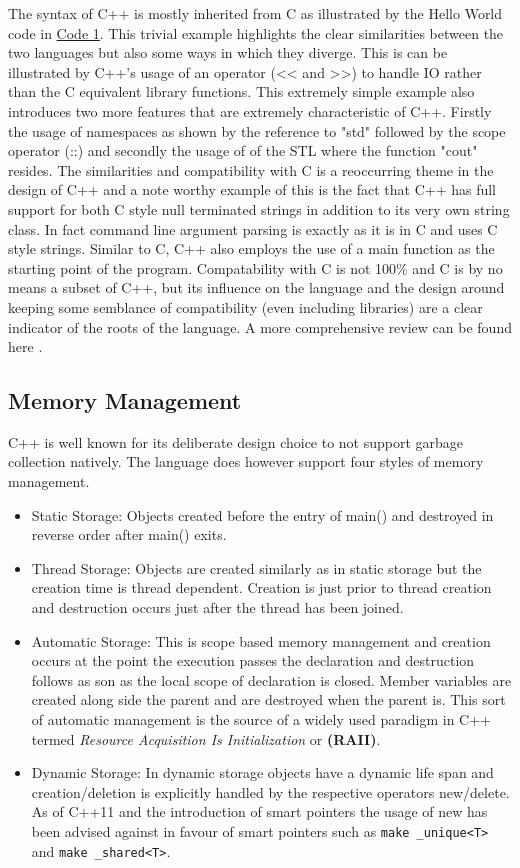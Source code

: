 \documentclass[conference, a4paper]{IEEEtran}
\begin{document}
The syntax of C++ is mostly inherited from C as illustrated by the Hello World code in \hyperref[listing:1]{Code 1}. This trivial example highlights the clear similarities between the two languages but also some ways in which they diverge. This is can be illustrated by C++'s usage of an operator (<< and >>) to handle IO rather than the C equivalent library functions. This extremely simple example also introduces two more features that are extremely characteristic of C++. Firstly the usage of namespaces as shown by the reference to "std" followed by the scope operator (::) and secondly the usage of of the STL where the function "cout" resides. The similarities and compatibility with C is a reoccurring theme in the design of C++ and a note worthy example of this is the fact that C++ has full support for both C style null terminated strings in addition to its very own string class. In fact command line argument parsing is exactly as it is in C and uses C style strings. Similar to C, C++ also employs the use of a main function as the starting point of the program. Compatability with C is not 100\% and C is by no means a subset of C++, but its influence on the language and the design around keeping some semblance of compatibility (even including libraries) are a clear indicator of the roots of the language. A more comprehensive review can be found here \cite{calder1994quantifying}.

\subsection{Memory Management}

C++ is well known for its deliberate design choice to not support garbage collection natively. The language does however support four styles of memory management. 

\begin{itemize}
    \item Static Storage: Objects created before the entry of main() and destroyed in reverse order after main() exits.
    \item Thread Storage:  Objects are created similarly as in static storage but the creation time is thread dependent. Creation is just prior to thread creation and destruction occurs just after the thread has been joined. 
    \item Automatic Storage: This is scope based memory management and creation occurs at the point the execution passes the declaration and destruction follows as son as the local scope of declaration is closed. Member variables are created along side the parent and are destroyed when the parent is. This sort of automatic management is the source of a widely used paradigm in C++ termed \textit{Resource Acquisition Is Initialization} or \textbf{(RAII)}.
    \item Dynamic Storage: In dynamic storage objects have a dynamic life span and creation/deletion is explicitly handled by the respective operators new/delete. As of C++11 and the introduction of smart pointers the usage of new has been advised against in favour of smart pointers such as \texttt{make _unique<T>} and \texttt{make _shared<T>}.

\end{itemize}
\end{document}
